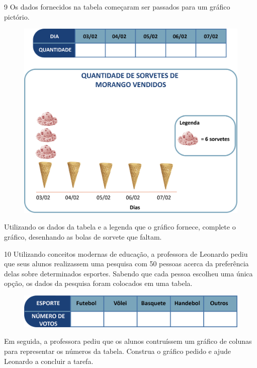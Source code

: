 \num{9} Os dados fornecidos na tabela começaram ser passados para um
gráfico pictório.

\begin{figure}[htpb!]
\centering
\includegraphics[width=.7\textwidth]{./media/image84.png}
\end{figure}

\pagebreak

Utilizando os dados da tabela e a legenda que o gráfico fornece,
complete o gráfico, desenhando as bolas de sorvete que faltam.

\num{10} Utilizando conceitos modernas de educação, a professora de Leonardo
pediu que seus alunos realizassem uma pesquisa com 50 pessoas acerca da
preferência delas sobre determinados esportes. Sabendo que cada pessoa
escolheu uma única opção, os dados da pesquisa foram colocados em uma tabela.

\begin{figure}[htpb!]
\centering
\includegraphics[width=\textwidth]{./media/image85.png}
\end{figure}

Em seguida, a professora pediu que os alunos contruíssem um gráfico de
colunas para representar os números da tabela. Construa o gráfico pedido
e ajude Leonardo a concluir a tarefa.

